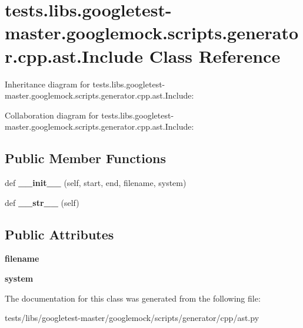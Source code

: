 \hypertarget{classtests_1_1libs_1_1googletest-master_1_1googlemock_1_1scripts_1_1generator_1_1cpp_1_1ast_1_1Include}{}\section{tests.\+libs.\+googletest-\/master.googlemock.\+scripts.\+generator.\+cpp.\+ast.\+Include Class Reference}
\label{classtests_1_1libs_1_1googletest-master_1_1googlemock_1_1scripts_1_1generator_1_1cpp_1_1ast_1_1Include}


Inheritance diagram for tests.\+libs.\+googletest-\/master.googlemock.\+scripts.\+generator.\+cpp.\+ast.\+Include\+:


Collaboration diagram for tests.\+libs.\+googletest-\/master.googlemock.\+scripts.\+generator.\+cpp.\+ast.\+Include\+:
\subsection*{Public Member Functions}
\begin{DoxyCompactItemize}
\item 
\mbox{\label{classtests_1_1libs_1_1googletest-master_1_1googlemock_1_1scripts_1_1generator_1_1cpp_1_1ast_1_1Include_abed25b2c8fd323b78d911743884805d6}} 
def {\bfseries \+\_\+\+\_\+init\+\_\+\+\_\+} (self, start, end, filename, system)
\item 
\mbox{\label{classtests_1_1libs_1_1googletest-master_1_1googlemock_1_1scripts_1_1generator_1_1cpp_1_1ast_1_1Include_abc035026e3b5773a76485db7aebda071}} 
def {\bfseries \+\_\+\+\_\+str\+\_\+\+\_\+} (self)
\end{DoxyCompactItemize}
\subsection*{Public Attributes}
\begin{DoxyCompactItemize}
\item 
\mbox{\label{classtests_1_1libs_1_1googletest-master_1_1googlemock_1_1scripts_1_1generator_1_1cpp_1_1ast_1_1Include_ad3710596a4f1df0e6d49149dc0fe0ea3}} 
{\bfseries filename}
\item 
\mbox{\label{classtests_1_1libs_1_1googletest-master_1_1googlemock_1_1scripts_1_1generator_1_1cpp_1_1ast_1_1Include_a71eb791a52cc13e11c51a3ffc3e20ea2}} 
{\bfseries system}
\end{DoxyCompactItemize}


The documentation for this class was generated from the following file\+:\begin{DoxyCompactItemize}
\item 
tests/libs/googletest-\/master/googlemock/scripts/generator/cpp/ast.\+py\end{DoxyCompactItemize}
